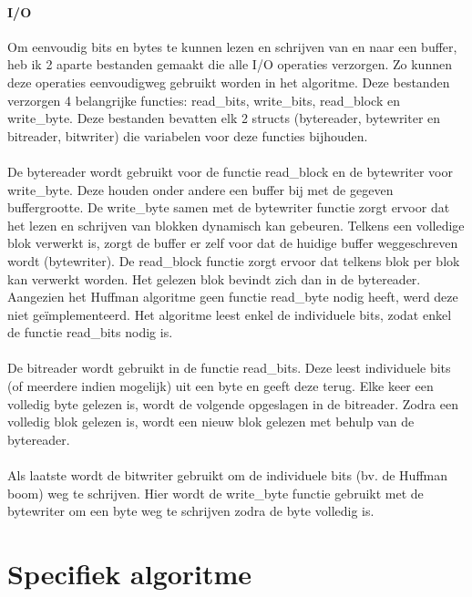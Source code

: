 \documentclass[11pt, a4paper]{article}
\begin{document}
\paragraph{I/O}
Om eenvoudig bits en bytes te kunnen lezen en schrijven van en naar een buffer, heb ik 2 aparte bestanden gemaakt die alle I/O operaties verzorgen. Zo kunnen deze operaties eenvoudigweg gebruikt worden in het algoritme. Deze bestanden verzorgen 4 belangrijke functies: read\_bits, write\_bits, read\_block en write\_byte. Deze bestanden bevatten elk 2 structs (bytereader, bytewriter en bitreader, bitwriter) die variabelen voor deze functies bijhouden. 
\\\\De bytereader wordt gebruikt voor de functie read\_block en de bytewriter voor write\_byte. Deze houden onder andere een buffer bij met de gegeven buffergrootte. De write\_byte samen met de bytewriter functie zorgt ervoor dat het lezen en schrijven van blokken dynamisch kan gebeuren. Telkens een volledige blok verwerkt is, zorgt de buffer er zelf voor dat de huidige buffer weggeschreven wordt (bytewriter). De read\_block functie zorgt ervoor dat telkens blok per blok kan verwerkt worden. Het gelezen blok bevindt zich dan in de bytereader. Aangezien het Huffman algoritme geen functie read\_byte nodig heeft, werd deze niet ge\"{i}mplementeerd. Het algoritme leest enkel de individuele bits, zodat enkel de functie read\_bits nodig is.
\\\\De bitreader wordt gebruikt in de functie read\_bits. Deze leest individuele bits (of meerdere indien mogelijk) uit een byte en geeft deze terug. Elke keer een volledig byte gelezen is, wordt de volgende opgeslagen in de bitreader. Zodra een volledig blok gelezen is, wordt een nieuw blok gelezen met behulp van de bytereader. 
\\\\Als laatste wordt de bitwriter gebruikt om de individuele bits (bv. de Huffman boom) weg te schrijven. Hier wordt de write\_byte functie gebruikt met de bytewriter om een byte weg te schrijven zodra de byte volledig is. 

\section{Specifiek algoritme}
\end{document}
